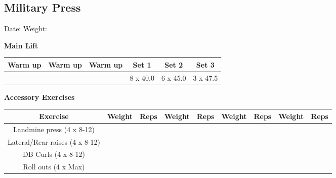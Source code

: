 \documentclass{article}%
\begin{document}
\subsection*{Military Press}%
Date: %
\linebreak%
Weight: %
\vspace*{20pt}%
\linebreak%
\begin{minipage}{0.5\textwidth}%
\textbf{Main Lift\newline%
\newline%
}%
\begin{tabular}{|c|c|c|c|c|c|}%
\hline%
Warm up&Warm up&Warm up&Set 1&Set 2&Set 3\\%
\hline%
&&&8 x 40.0&6 x 45.0&3 x 47.5\\%
\hline%
\end{tabular}%
\vspace*{20pt}%
\linebreak%
\textbf{Accessory Exercises\newline%
\newline%
}%
\begin{tabular}{|c|c|c|c|c|c|c|c|c|}%
\hline%
Exercise&Weight&Reps&Weight&Reps&Weight&Reps&Weight&Reps\\%
\hline%
Landmine press (4 x 8{-}12)&&&&&&&&\\%
\hline%
Lateral/Rear raises (4 x 8{-}12)&&&&&&&&\\%
\hline%
DB Curls (4 x 8{-}12)&&&&&&&&\\%
\hline%
Roll outs (4 x Max)&&&&&&&&\\%
\hline%
\end{tabular}%
\end{minipage}%
\vspace*{20pt}%
\linebreak

%
\end{document}
